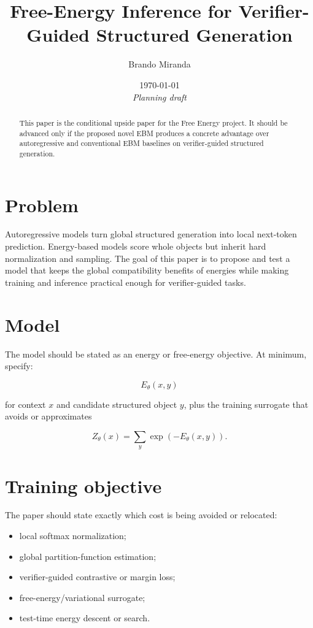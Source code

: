 \documentclass[11pt]{article}
\title{Free-Energy Inference for Verifier-Guided Structured Generation}
\author{Brando Miranda}
\date{\today \\ \emph{Planning draft}}
\newcommand{\Etheta}{E_\theta}
\newcommand{\Ztheta}{Z_\theta}
\begin{document}
\maketitle

\begin{abstract}
This paper is the conditional upside paper for the Free Energy project.
It should be advanced only if the proposed novel EBM produces a concrete
advantage over autoregressive and conventional EBM baselines on verifier-guided
structured generation.
\end{abstract}

\section{Problem}

Autoregressive models turn global structured generation into local next-token
prediction.
Energy-based models score whole objects but inherit hard normalization and
sampling.
The goal of this paper is to propose and test a model that keeps the global
compatibility benefits of energies while making training and inference practical
enough for verifier-guided tasks.

\section{Model}

The model should be stated as an energy or free-energy objective.
At minimum, specify:

\begin{equation}
  \Etheta(x, y)
\end{equation}

for context $x$ and candidate structured object $y$, plus the training surrogate
that avoids or approximates

\begin{equation}
  \Ztheta(x) = \sum_y \exp(-\Etheta(x,y)).
\end{equation}

\section{Training objective}

The paper should state exactly which cost is being avoided or relocated:

\begin{itemize}[leftmargin=2em]
  \item local softmax normalization;
  \item global partition-function estimation;
  \item verifier-guided contrastive or margin loss;
  \item free-energy/variational surrogate;
  \item test-time energy descent or search.
\end{itemize}
\end{document}
